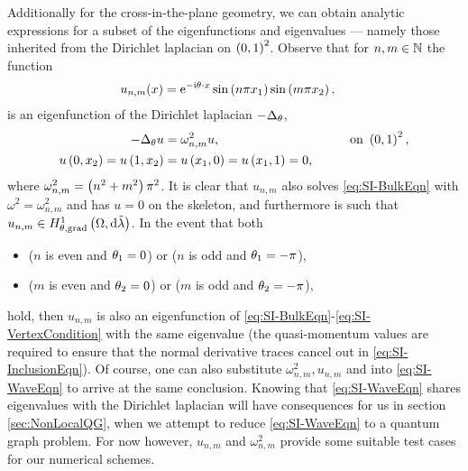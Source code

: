 Additionally for the cross-in-the-plane geometry, we can obtain analytic expressions for a subset of the eigenfunctions and eigenvalues --- namely those inherited from the Dirichlet laplacian on $\left( 0,1 \right)^2$.
Observe that for $n,m\in\mathbb{N}$ the function
\begin{align*}
	u_{n,m}(x) &= \mathrm{e}^{-\mathrm{i}\theta\cdot x}\sin\left( n\pi x_1 \right)\sin\left( m\pi x_2 \right),
\end{align*}
is an eigenfunction of the Dirichlet laplacian $-\Delta_{\theta}$,
\begin{align*}
	-\Delta_{\theta}u &= \omega_{n,m}^2 u, &\qquad \text{on } \left( 0,1 \right)^2, \\
	u\left( 0,x_2 \right) = u\left( 1,x_2 \right) &= u\left( x_1,0 \right) = u\left( x_1,1 \right) = 0,
\end{align*}
where $\omega_{n,m}^2 = \left( n^2+m^2 \right)\pi^2$.
It is clear that $u_{n,m}$ also solves \eqref{eq:SI-BulkEqn} with $\omega^2 = \omega_{n,m}^2$ and has $u=0$ on the skeleton, and furthermore is such that $u_{n,m}\in H^1_{\theta, \mathrm{grad}}\left( \Omega, \mathrm{d}\tilde{\lambda} \right)$.
In the event that both
\begin{itemize}
	\item ($n$ is even and $\theta_1=0$) or ($n$ is odd and $\theta_1=-\pi$),
	\item ($m$ is even and $\theta_2=0$) or ($m$ is odd and $\theta_2=-\pi$),
\end{itemize}
hold, then $u_{n,m}$ is also an eigenfunction of \eqref{eq:SI-BulkEqn}-\eqref{eq:SI-VertexCondition} with the same eigenvalue (the quasi-momentum values are required to ensure that the normal derivative traces cancel out in \eqref{eq:SI-InclusionEqn}).
Of course, one can also substitute $\omega^2_{n,m}, u_{n,m}$ and into \eqref{eq:SI-WaveEqn} to arrive at the same conclusion.
Knowing that \eqref{eq:SI-WaveEqn} shares eigenvalues with the Dirichlet laplacian will have consequences for us in section \ref{sec:NonLocalQG}, when we attempt to reduce \eqref{eq:SI-WaveEqn} to a quantum graph problem.
For now however, $u_{n,m}$ and $\omega_{n,m}^2$ provide some suitable test cases for our numerical schemes.

